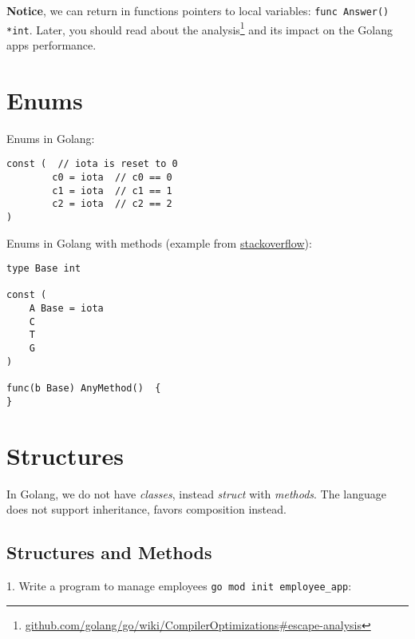\documentclass[11pt, letterpaper]{article}
\begin{document}
\textbf{Notice}, we can return in functions pointers to local variables: \texttt{func Answer() *int}. Later, you should read about the analysis\footnote{\href{https://github.com/golang/go/wiki/CompilerOptimizations\#escape-analysis}{github.com/golang/go/wiki/CompilerOptimizations\#escape-analysis}} and its impact on the Golang apps performance.

\pagebreak

\section{Enums}

Enums in Golang:

\begin{verbatim}
const (  // iota is reset to 0
        c0 = iota  // c0 == 0
        c1 = iota  // c1 == 1
        c2 = iota  // c2 == 2
)
\end{verbatim}

Enums in Golang with methods (example from \href{https://stackoverflow.com/questions/14426366/what-is-an-idiomatic-way-of-representing-enums-in-go}{stackoverflow}):

\begin{verbatim}
type Base int

const (
    A Base = iota
    C
    T
    G
)

func(b Base) AnyMethod()  {
}
\end{verbatim}

\pagebreak

\section{Structures}

In Golang, we do not have \emph{classes}, instead \emph{struct} with \emph{methods}. The language does not support inheritance, favors composition instead.

\subsection{Structures and Methods}

1. Write a program to manage employees \texttt{go mod init employee_app}:
\end{document}
